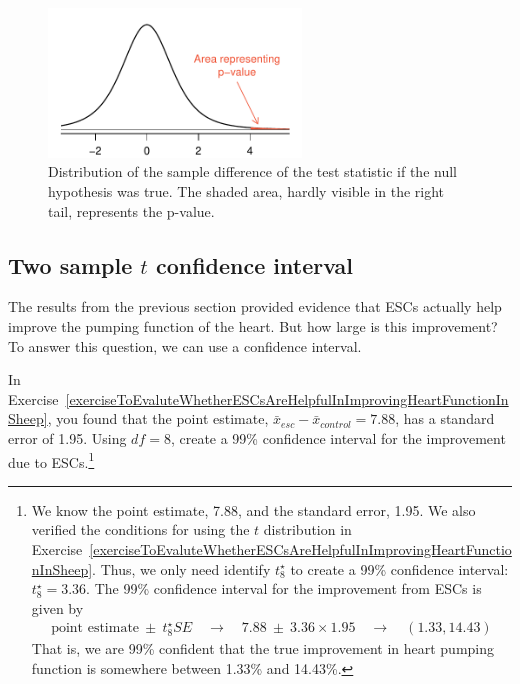 \begin{figure}
\centering
\includegraphics[width=0.6\textwidth]{05/figures/stemCellTherapyForHeartsPValue/stemCellTherapyForHeartsPValue}
\caption{Distribution of the sample difference of the test statistic if the null hypothesis was true. The shaded area, hardly visible in the right tail, represents the p-value.}
\label{stemCellTherapyForHeartsPValue}
\end{figure}

\subsection{Two sample $t$ confidence interval}

The results from the previous section provided evidence that ESCs actually help improve the pumping function of the heart. But how large is this improvement? To answer this question, we can use a confidence interval. 

\begin{exercise}
In Exercise~\ref{exerciseToEvaluteWhetherESCsAreHelpfulInImprovingHeartFunctionInSheep}, you found that the point estimate, $\bar{x}_{esc} - \bar{x}_{control} = 7.88$, has a standard error of 1.95. Using $df=8$, create a 99\% confidence interval for the improvement due to ESCs.\footnote{We know the point estimate, 7.88, and the standard error, 1.95. We also verified the conditions for using the $t$ distribution in Exercise~\ref{exerciseToEvaluteWhetherESCsAreHelpfulInImprovingHeartFunctionInSheep}. Thus, we only need identify $t^{\star}_8$ to create a 99\% confidence interval: $t^{\star}_{8} = 3.36$. The 99\% confidence interval for the improvement from ESCs is given by
\begin{eqnarray*}
\text{point estimate}\ \pm\ t_{8}^{\star}SE
	\quad\to\quad 7.88\ \pm\ 3.36\times 1.95
	\quad\to\quad (1.33, 14.43)
\end{eqnarray*}
That is, we are 99\% confident that the true improvement in heart pumping function is somewhere between 1.33\% and 14.43\%.}


\end{exercise}


